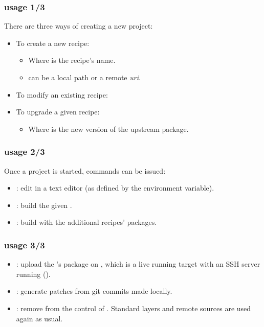 \begin{frame}
  \frametitle{ usage 1/3}
  There are three ways of creating a new  project:
  \begin{itemize}
    \item To create a new recipe:
      \begin{itemize}
        \item Where  is the recipe's name.
        \item {} can be a local path or a remote {\em
          uri}.
      \end{itemize}
    \item To modify an existing recipe: 
    \item To upgrade a given recipe:
      \begin{itemize}
        \item Where  is the new version of the upstream
          package.
      \end{itemize}
  \end{itemize}
\end{frame}

\begin{frame}
  \frametitle{ usage 2/3}
  Once a  project is started, commands can be issued:
  \begin{itemize}
    \item {}: edit  in a text
      editor (as defined by the  environment variable).
    \item {}: build the given
      .
    \item {}: build  with
      the additional  recipes' packages.
  \end{itemize}
\end{frame}

\begin{frame}
  \frametitle{ usage 3/3}
  \begin{itemize}
    \item {}: upload the
      's package on , which is a live
      running target with an SSH server running ().
    \item {}: generate patches from
      git commits made locally.
    \item {}: remove  from the
      control of . Standard layers and remote sources
      are used again as usual.
  \end{itemize}
\end{frame}

